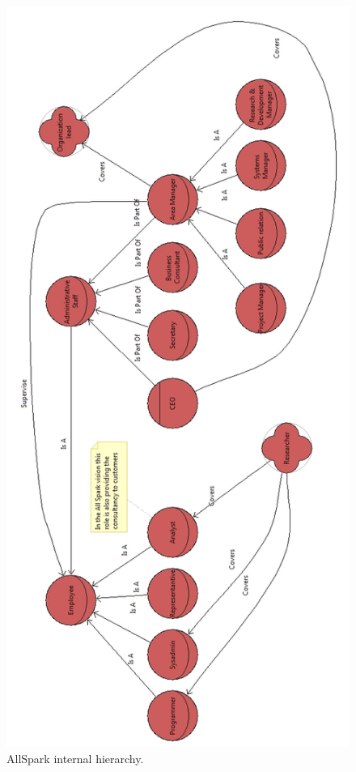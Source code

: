\begin{figure}
\centering
\includegraphics[scale=0.42]{Si_star/img/hierarchy}
\caption{AllSpark internal hierarchy.}
\label{img:hierarchy}
\end{figure}

